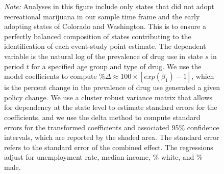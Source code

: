\documentclass[12pt]{article}%
\begin{document}
\begin{figure}
\begin{minipage}{.9\linewidth}
\begin{subfigure}[b]{0.32\columnwidth}
        \end{subfigure}
        \begin{justify}
            {\footnotesize
            \emph{Note:} 
                Analyses in this figure include only states that did not adopt recreational marijuana in our sample time frame and the early adopting states of Colorado and Washington. This is to ensure a perfectly balanced composition of states contributing to the identification of each event-study point estimate. The dependent variable is the natural log of the prevalence of drug use in state $s$ in period $t$ for a specified age group and type of drug. We use the model coefficients to compute $\% \Delta \approx 100\times \left[exp(\beta_1)-1\right]$, which is the percent change in the prevalence of drug use generated a given policy change.  We use a cluster robust variance matrix that allows for dependency at the state level to estimate standard errors for the coefficients, and we use the delta method to compute standard errors for the transformed coefficients and associated 95\% confidence intervals, which are reported by the shaded area. The standard error refers to the standard error of the combined effect. The regressions adjust for unemployment rate, median income, \% white, and \% male. 
            \par}
        \end{justify}
    \end{minipage}
    \label{fig:event-study-early-adopters}
\end{figure}
\end{document}

